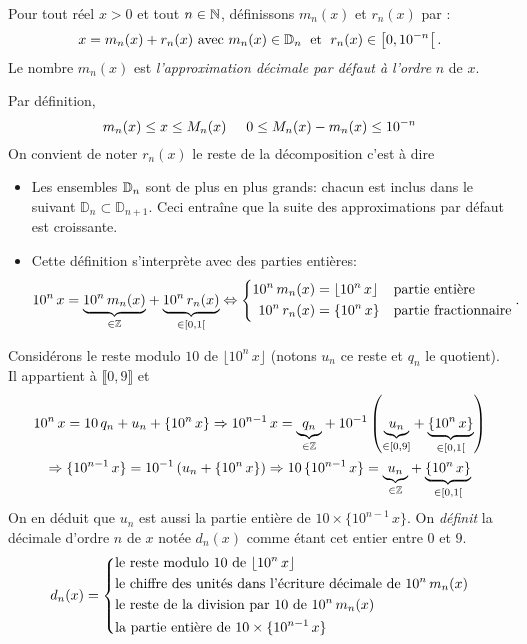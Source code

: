 \begin{defi}
Pour tout réel $x>0$ et tout $n\in \mathbb{N}$, définissons $m_n(x)$ et $r_n(x)$ par :
\[
  x = m_n(x) + r_n(x) \text{ avec } m_n(x)\in \mathbb{D}_n \;\text{ et } \; r_n(x) \in \left[0, 10^{-n}\right[.
\]
Le nombre $m_n(x)$ est \emph{l'approximation décimale par défaut à l'ordre} $n$ de $x$.
\end{defi}
Par définition,
\[
 m_n(x)\leq x \leq M_n(x) \hspace{0.5cm}  0 \leq M_n(x) -m_n(x) \leq 10^{-n}
\]
On convient de noter $r_n(x)$ le reste de la décomposition c'est à dire
\begin{rems}
\begin{itemize}
  \item Les ensembles $\mathbb{D}_n$ sont de plus en plus grands: chacun est inclus dans le suivant $\mathbb D_n \subset \mathbb D_{n+1}$. Ceci entraîne que la suite des approximations par défaut est croissante.
  \item Cette définition s'interprète avec des parties entières:
\[
  10^n\, x = \underset{\in \mathbb{Z}}{\underbrace{10^n\,m_n(x)}} + \underset{\in [0,1[}{\underbrace{10^n\,r_n(x)}}
  \Leftrightarrow 
  \left\lbrace
  \begin{aligned}
    10^n\,m_n(x) &= \lfloor 10^n\,x\rfloor& &\text{partie entière} \\
    10^n\,r_n(x) &= \{ 10^n\,x \}& &\text{partie fractionnaire}
  \end{aligned}
  \right.
.
\]
\end{itemize}
\end{rems}
Considérons le reste modulo $10$ de $\lfloor 10^n\,x\rfloor$ (notons $u_n$ ce reste et $q_n$ le quotient). Il appartient à $\llbracket 0, 9 \rrbracket$ et
\begin{multline*}
  10^n\, x = 10\, q_n + u_n + \{ 10^{n}\,x \}
  \Rightarrow 10^{n-1}\, x = \underset{\in \mathbb{Z}}{\underbrace{q_n}} + 10^{-1}\left(\underset{\in \left[0,9\right]}{\underbrace{u_n}} + \underset{\in \left[0,1\right[}{\underbrace{\{ 10^{n}\,x \}}}\right)\\
  \Rightarrow \{ 10^{n-1}\,x \} = 10^{-1}\left( u_n + \{ 10^{n}\,x \}\right)
  \Rightarrow 10\, \{ 10^{n-1}\,x \} = \underset{\in \mathbb{Z}}{\underbrace{u_n}} + \underset{\in \left[0,1\right[}{\underbrace{\{ 10^{n}\,x \}}}
\end{multline*}
On en déduit que $u_n$ est aussi la partie entière de $ 10\times\{ 10^{n-1}\,x \}$.\newline
On \emph{définit} la décimale d'ordre $n$ de $x$ notée $d_n(x)$ comme étant cet entier entre $0$ et $9$.
\[
 d_n(x) =
 \left\lbrace
 \begin{aligned}
   &\text{le reste modulo $10$ de $\lfloor 10^n\,x\rfloor$}\\
   &\text{le chiffre des unités dans l'écriture décimale de $10^n\, m_n(x)$}\\
   &\text{le reste de la division par 10 de $10^n\, m_n(x)$}\\
   &\text{la partie entière de $ 10\times\{ 10^{n-1}\,x \}$}
 \end{aligned}
\right.
\]

